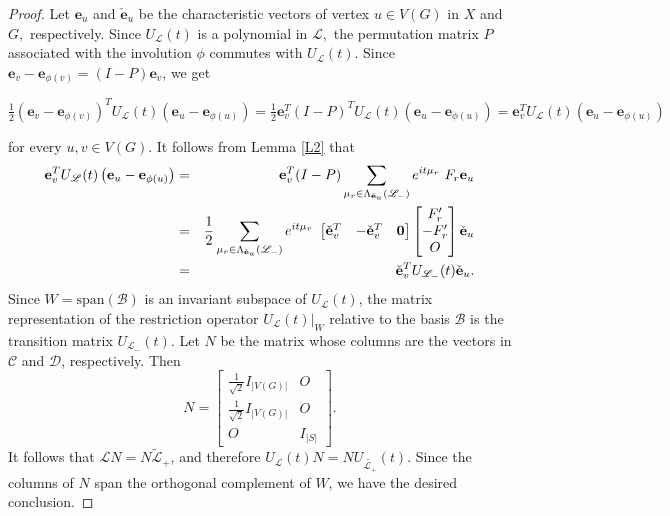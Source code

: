 \documentclass[12pt,a4paper]{article}
\def \e {{\mathbf e}}
\def \o {{\bf 0}}
\newcommand{\ob}[1]{\left(#1\right)}
\begin{document}
\begin{proof}
Let $\e_u$ and $\check{\e}_u$ be the characteristic vectors of vertex $u\in V(G)$ in $X$ and $G,$ respectively. Since $U_\mathscr{L}(t)$ is a polynomial in $\mathscr{L},$ the permutation matrix $P$ associated with the involution $\phi$ commutes with $U_\mathscr{L}(t).$ Since $\e_v-\e_{\phi(v)}=\ob{I-P}\e_v$, we get
\begin{center}
$\frac{1}{2}\ob{\e_v-\e_{\phi(v)}}^T U_\mathscr{L}(t)(\e_u-\e_{\phi(u)}) 
 = \frac{1}{2}\e_v^T(I-P)^TU_\mathscr{L}(t)\ob{\e_u-\e_{\phi(u)}}= \e_v^TU_\mathscr{L}(t)(\e_u-\e_{\phi(u)})$
\end{center}
for every $u,v\in V\ob{G}$. It follows from Lemma \ref{L2} that
\begin{eqnarray*}
  \e_v^TU_\mathscr{L}(t)\ob{\e_u-\e_{\phi(u)}} &=& \e_v^T(I-P)\sum_{\mu_r \in \Lambda_{\check{\e}_u}(\mathscr{L}_-)}e^{it\mu_r}~F_r\e_u\\
  &=& \frac{1}{2}\sum_{\mu_r \in \Lambda_{\check{\e}_u}(\mathscr{L}_-)}e^{it\mu_r}~ \begin{bmatrix}
      \check{\e}_v^T& -\check{\e}_v^T& \o
  \end{bmatrix} \begin{bmatrix}
   F_r'\\
   -F_r'\\
   O
  \end{bmatrix}\check{\e}_u\\
  &=& \check{\e}_v^T U_{\mathscr{L}_-}(t) \check{\e}_u.
\end{eqnarray*}
Since $W = \text{span}(\mathcal{B})$ is an invariant subspace of $U_{\mathscr{L}}(t)$, the matrix representation of the restriction operator $U_{\mathscr{L}}(t)|_W$ relative to the basis $\mathcal{B}$ is the transition matrix $U_{\mathscr{L}_-}(t)$. Let $N$ be the matrix whose columns are the vectors in $\mathcal{C}$ and $\mathcal{D}$, respectively. Then
\[
N = \begin{bmatrix}
\frac{1}{\sqrt{2}} I_{|V(G)|} & O\\
\frac{1}{\sqrt{2}} I_{|V(G)|} & O \\
O & I_{|S|}
\end{bmatrix}.
\]
It follows that $\mathscr{L}N=N\widetilde{\mathscr{L}}_+$, and therefore $U_\mathscr{L}(t)N=NU_{\widetilde{\mathscr{L}_+}}(t).$ Since the columns of $N$ span the orthogonal complement of $W$, we have the desired conclusion.
\end{proof}
\end{document}
